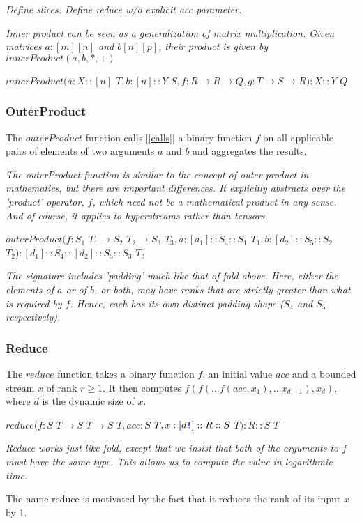\documentclass{article}
\begin{document}
{\em Define slices. Define reduce w/o explicit acc parameter.}

{\em Inner product can be seen as a generalization of matrix multiplication.  Given matrices $a: [m][n]$ and $b[n][p]$, their product is given by
 $innerProduct(a, b, *, +)$

}

$innerProduct(a: X:: [n]$ $T, b: [n]::Y$ $S,  f: R \to R \to Q, g: T \to S \to R): X::Y$ $Q$

\subsubsection{OuterProduct}
\label{outerProduct}

The $outerProduct$ function calls [\ref{calls}] a binary function $f$ on all applicable pairs of elements of two arguments $a$ and $b$ and aggregates the results.

{\em
The outerProduct function is similar to the concept of outer product in mathematics, but there are important differences. It explicitly abstracts over the 'product' operator, $f$, which need not be a mathematical product in any sense. And of course, it applies to hyperstreams rather than tensors.
}

$outerProduct(f: S_1 $ $T_1 \to{} S_2 $ $T_2 \to{} S_3 $ $T_3, a: [d_1]::S_4::S_1 $ $T_1, b: [d_2]::S_5::S_2 $ $T_2): [d_1]::S_4::[d_2]::S_5::S_3 $ $T_3$

{\em
The signature includes 'padding' much like that of fold above. Here, either the elements of $a$ or of $b$, or both, may have ranks that are strictly greater than what is required by $f$.
Hence, each has its own distinct padding shape ($S_4$ and $S_5$ respectively).
}


\subsubsection{Reduce}
\label{reduce}

The $reduce$ function takes a binary function $f$, an initial value $acc$ and a bounded stream $x$ of rank $r \ge 1$. It then computes
$f(f( \ldots f(acc, x_1), \ldots x_{d-1}), x_d)$, where $d$ is the dynamic size of $x$.

$reduce(f: S $ $T \to{} S $ $T \to{} S $ $T, acc: S $ $T, x:[d\texttt{\color{blue} !}]::R::S $ $T): R::S $ $T$

{\em
Reduce works just like fold, except that we insist that both of the arguments to $f$ must have the same type. This allows us to compute the
value in logarithmic time.

The name reduce is motivated by the fact that it reduces the rank of its input $x$ by 1.
}
\end{document}

